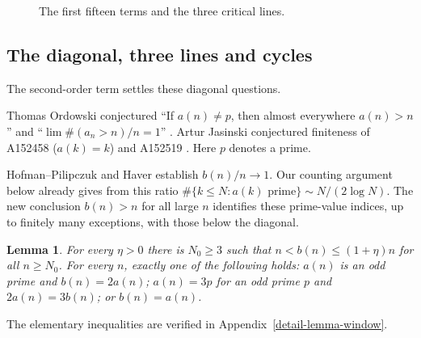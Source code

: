 \documentclass[11pt]{article}
\newtheorem{lemma}[theorem]{Lemma}
\theoremstyle{remark}
\begin{document}
\begin{figure}[ht]
\centering
{}
\caption{The first fifteen terms and the three critical lines.}\label{fig:branches}
\end{figure}

\subsection*{The diagonal, three lines and cycles}\label{sec:consequences}
The second-order term settles these diagonal questions.

Thomas Ordowski conjectured ``If $a(n)\neq p$, then almost
everywhere $a(n)>n$'' and ``$\lim\#(a_n>n)/n=1$''
\cite[A064413, comments, January 23, 2009]{oeis}. Artur Jasinski conjectured finiteness of A152458 ($a(k)=k$) and
A152519
\cite[A152458 and A152519, comments, December 2008]{oeis}.
Here $p$ denotes a prime.

Hofman--Pilipczuk \cite[Theorem~4.17]{hp} and Haver
\cite[Corollary~12(c)]{haver} establish $b(n)/n\to1$.
Our counting argument below already gives from this ratio
$\#\{k\leq N:a(k)\text{ prime}\}\sim N/(2\log N)$.
The new conclusion $b(n)>n$ for all large $n$ identifies these prime-value
indices, up to finitely many exceptions, with those below the diagonal.

\begin{lemma}\label{lem:window}
For every $\eta>0$ there is $N_0\geq3$ such that $n<b(n)\leq(1+\eta)n$
for all $n\geq N_0$. For every $n$, exactly one of the following holds:
$a(n)$ is an odd prime and $b(n)=2a(n)$; $a(n)=3p$ for an odd prime $p$
and $2a(n)=3b(n)$; or $b(n)=a(n)$.
\end{lemma}
\noindent The elementary inequalities are verified in Appendix~\ref{detail-lemma-window}.
\end{document}
